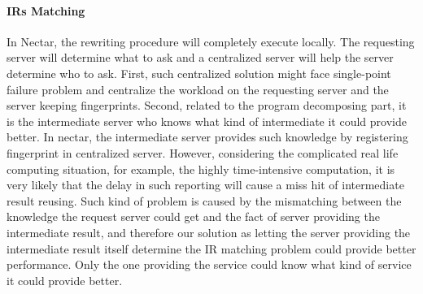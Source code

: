\paragraph{IRs Matching}
In Nectar, the rewriting procedure will completely execute locally. The requesting server will determine what to ask and a centralized server will help the server determine who to ask. First, such centralized solution might face single-point failure problem and centralize the workload on the requesting server and the server keeping fingerprints. Second, related to the program decomposing part, it is the intermediate server who knows what kind of intermediate it could provide better. In nectar, the intermediate server provides such knowledge by registering fingerprint in centralized server. However, considering the complicated real life computing situation, for example, the highly time-intensive computation, it is very likely that the delay in such reporting will cause a miss hit of intermediate result reusing. Such kind of problem is caused by the mismatching between the knowledge the request server could get and the fact of server providing the intermediate result, and therefore our solution as letting the server providing the intermediate result itself determine the IR matching problem could provide better performance. Only the one providing the service could know what kind of service it could provide better.
 
